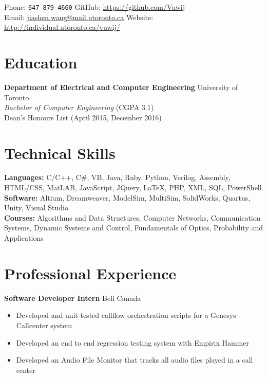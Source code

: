 \documentclass[10pt, a4paper]{cv}
\begin{document}

Phone: \texttt{647-879-4660} \hfill
GitHub: \href{https://github.com/Vuwij}{https://github.com/Vuwij}\\
Email: \href{mailto:jiashen.wang@mail.utoronto.ca}{jiashen.wang@mail.utoronto.ca}\hfill
Website: \href{http://individual.utoronto.ca/vuwij/}{http://individual.utoronto.ca/vuwij/}\\

\section*{Education}
\textbf{Department of Electrical and Computer Engineering} \hfill University of Toronto\\
\emph{Bachelor of Computer Engineering} \small{\textsc{(CGPA 3.1)}}\\[0.1mm]
\small Dean's Honours List (April 2015, December 2016)

\section*{Technical Skills}
\textbf{Languages:} C/C++, C\#, VB, Java, Ruby, Python, Verilog, Assembly, HTML/CSS, MatLAB, JavaScript, JQuery, LaTeX, PHP, XML, SQL, PowerShell\\[0.2em]
\textbf{Software:} Altium, Dreamweaver, ModelSim, MultiSim, SolidWorks, Quartus, Unity, Visual Studio\\[0.2em]
\textbf{Courses:} Algorithms and Data Structures, Computer Networks, Communication Systems, Dynamic Systems and Control, Fundamentals of Optics, Probability and Applications

\section*{Professional Experience}\noindent

	\textbf{Software Developer Intern} \hfill Bell Canada
	\begin{itemize}
		\item Developed and unit-tested callflow orchestration scripts for a Genesys Callcenter system
		\item Developed an end to end regression testing system with Empirix Hammer
		\item Developed an Audio File Monitor that tracks all audio files played in a call center
	\end{itemize}
	
\end{document}
